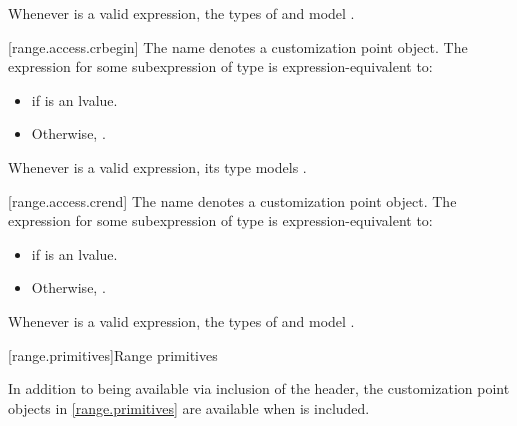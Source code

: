 \begin{addedblock}
\pnum
\begin{note}
Whenever  is a valid expression, the
types  of  and 
model .
\end{note}

[range.access.crbegin]{}
\pnum
The name  denotes a customization point
object. The expression
 for some subexpression  of type
 is expression-equivalent to:
\begin{itemize}
\item {} if  is
  an lvalue.
\item Otherwise, .
\end{itemize}

\pnum
\begin{note}
Whenever  is a valid expression, its
type models .
\end{note}

[range.access.crend]{}
\pnum
The name  denotes a customization point
object. The expression
 for some subexpression  of type 
is expression-equivalent to:
\begin{itemize}
\item {} if  is an lvalue.

\item Otherwise, .
\end{itemize}

\pnum
\begin{note}
Whenever  is a valid expression, the
types  of  and 
model .
\end{note}

[range.primitives]{Range primitives}

\pnum
In addition to being available via inclusion of the  header,
the customization point objects in \ref{range.primitives} are available
when  is included.


\end{addedblock}
